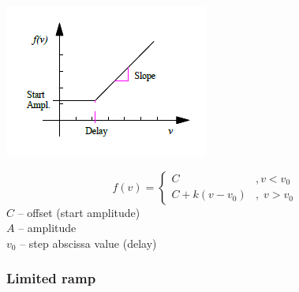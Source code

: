 \noindent
\begin{minipage}{0.45\textwidth}
  \includegraphics[width=\textwidth]{Figures/4-Functions_ramp}
\end{minipage}%
\hfill\begin{minipage}{0.5\textwidth}
  $$
    f(v)=\left\{\begin{array}{ll}
      C          &, v < v_0 \\
      C+k(v-v_0) &,\; v > v_0
    \end{array}\right.
  $$
  $C$ -- offset (start amplitude) \\
  $A$ -- amplitude \\
  $v_0$ -- step abscissa value (delay)
\end{minipage}

\subsubsection{Limited ramp}

